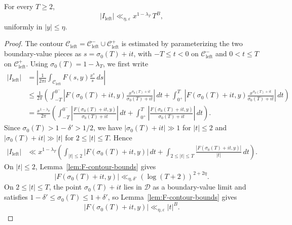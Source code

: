 \begin{lemma}
\label{lem:left-vertical-contour-bound}
For every $T \geq 2$,
\begin{equation}\label{eq:vertical-bound}
    |I_{\mathrm{left}}|
    \ll_{\eta, \varepsilon}
    x^{1 - \lambda_T} \, T^B,
\end{equation}
uniformly in $|y| \leq \eta$.
\end{lemma}

\begin{proof}
The contour $\mathcal{C}_{\mathrm{left}} =
\mathcal{C}_{\mathrm{left}}^- \cup \mathcal{C}_{\mathrm{left}}^+$
is estimated by parameterizing the two boundary-value pieces as
$s=\sigma_0(T)+it$, with $-T\leq t<0$ on
$\mathcal{C}_{\mathrm{left}}^-$ and $0<t\leq T$ on
$\mathcal{C}_{\mathrm{left}}^+$. Using
$\sigma_0(T)=1-\lambda_T$, we first write
\[
\begin{aligned}
    |I_{\mathrm{left}}|
    &= \left| \frac{1}{2\pi i}
       \int_{\mathcal C_{\mathrm{left}}}
       F(s,y)\frac{x^s}{s}\,ds \right| \\
    &\leq \frac{1}{2\pi}
       \left(
       \int_{-T}^{0^-}
       \left|F(\sigma_0(T)+it,y)
       \frac{x^{\sigma_0(T)+it}}{\sigma_0(T)+it}\right|\,dt
       +
       \int_{0^+}^{T}
       \left|F(\sigma_0(T)+it,y)
       \frac{x^{\sigma_0(T)+it}}{\sigma_0(T)+it}\right|\,dt
       \right) \\
    &= \frac{x^{1-\lambda_T}}{2\pi}
       \left(
       \int_{-T}^{0^-}
       \left|\frac{F(\sigma_0(T)+it,y)}
       {\sigma_0(T)+it}\right|\,dt
       +
       \int_{0^+}^{T}
       \left|\frac{F(\sigma_0(T)+it,y)}
       {\sigma_0(T)+it}\right|\,dt
       \right).
\end{aligned}
\]
Since $\sigma_0(T)>1-\delta'>1/2$, we have
$|\sigma_0(T)+it|\gg1$ for $|t|\leq2$ and
$|\sigma_0(T)+it|\gg |t|$ for $2\leq |t|\leq T$. Hence
\[
\begin{aligned}
    |I_{\mathrm{left}}|
    &\ll x^{1-\lambda_T}
    \left(
        \int_{|t|\leq2}|F(\sigma_0(T)+it,y)|\,dt
        + \int_{2\leq |t|\leq T}
        \frac{|F(\sigma_0(T)+it,y)|}{|t|}\,dt
    \right).
\end{aligned}
\]
On $|t|\leq2$, Lemma~\ref{lem:F-contour-bounds} gives
\[
    |F(\sigma_0(T)+it,y)|
    \ll_{\eta,\delta'}(\log(T+2))^{2+2\eta}.
\]
On $2\leq |t|\leq T$, the point $\sigma_0(T)+it$ lies in
$\mathcal D$ as a boundary-value limit and satisfies
$1-\delta'\leq\sigma_0(T)\leq1+\delta'$, so
Lemma~\ref{lem:F-contour-bounds} gives
\[
    |F(\sigma_0(T) + it, y)|
    \ll_{\eta,\varepsilon}|t|^B.
\]
\end{proof}
